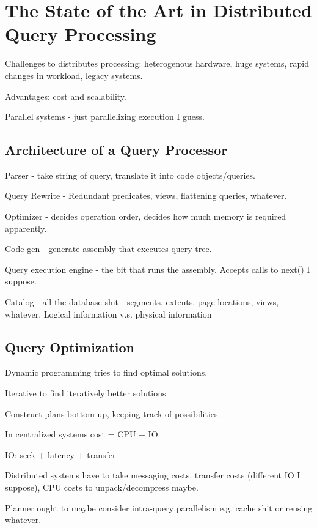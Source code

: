 \documentclass{article}
\begin{document}
\newpage
\section{The State of the Art in Distributed Query Processing}

	Challenges to distributes processing: heterogenous hardware, huge systems, rapid changes in workload, legacy systems.
	
	Advantages: cost and scalability.
	
	Parallel systems - just parallelizing execution I guess.
	
	\subsection{Architecture of a Query Processor}
	
		Parser - take string of query, translate it into code objects/queries.
		
		Query Rewrite - Redundant predicates, views, flattening queries, whatever.
		
		Optimizer - decides operation order, decides how much memory is required apparently.
		
		Code gen - generate assembly that executes query tree.
		
		Query execution engine - the bit that runs the assembly. Accepts calls to next() I suppose.
		
		Catalog - all the database shit - segments, extents, page locations, views, whatever. Logical information v.s. physical information
		
	\subsection{Query Optimization}
	
		Dynamic programming tries to find optimal solutions.
		
		Iterative to find iteratively better solutions.
		
		Construct plans bottom up, keeping track of possibilities.
		
		In centralized systems cost = CPU + IO.
		
		IO: seek + latency + transfer.
		
		Distributed systems have to take messaging costs, transfer costs (different IO I suppose), CPU costs to unpack/decompress maybe.
		
		Planner ought to maybe consider intra-query parallelism e.g. cache shit or reusing whatever.
		
\end{document}
